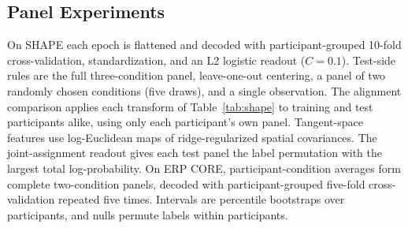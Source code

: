 \subsection{Panel Experiments}
On SHAPE each epoch is flattened and decoded with participant-grouped 10-fold cross-validation, standardization, and an L2 logistic readout ($C=0.1$). Test-side rules are the full three-condition panel, leave-one-out centering, a panel of two randomly chosen conditions (five draws), and a single observation. The alignment comparison applies each transform of Table~\ref{tab:shape} to training and test participants alike, using only each participant's own panel. Tangent-space features use log-Euclidean maps of ridge-regularized spatial covariances. The joint-assignment readout gives each test panel the label permutation with the largest total log-probability. On ERP CORE, participant-condition averages form complete two-condition panels, decoded with participant-grouped five-fold cross-validation repeated five times. Intervals are percentile bootstraps over participants, and nulls permute labels within participants.
